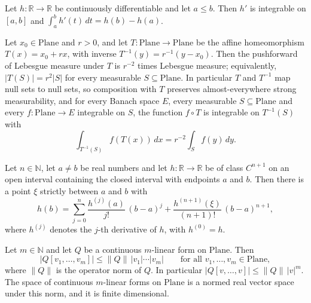 \begin{proposition}
Let $h\colon\mathbb{R}\to\mathbb{R}$ be continuously differentiable and let $a\le b$.  Then
$h'$ is integrable on $[a,b]$ and $\int_a^bh'(t)\,dt=h(b)-h(a)$.
\end{proposition}

\begin{proposition}
Let $x_0\in\mathrm{Plane}$ and $r>0$, and let $T\colon\mathrm{Plane}\to\mathrm{Plane}$ be the
affine homeomorphism $T(x)=x_0+rx$, with inverse $T^{-1}(y)=r^{-1}(y-x_0)$.  Then the
pushforward of Lebesgue measure under $T$ is $r^{-2}$ times Lebesgue measure; equivalently,
$\lvert T(S)\rvert=r^{2}\lvert S\rvert$ for every measurable $S\subseteq\mathrm{Plane}$.  In
particular $T$ and $T^{-1}$ map null sets to null sets, so composition with $T$ preserves
almost-everywhere strong measurability, and for every Banach space $E$, every measurable
$S\subseteq\mathrm{Plane}$ and every $f\colon\mathrm{Plane}\to E$ integrable on $S$, the
function $f\circ T$ is integrable on $T^{-1}(S)$ with
\[
  \int_{T^{-1}(S)}f(T(x))\,dx=r^{-2}\int_{S}f(y)\,dy .
\]
\end{proposition}

\begin{proposition}
Let $n\in\mathbb{N}$, let $a\neq b$ be real numbers and let $h\colon\mathbb{R}\to\mathbb{R}$ be
of class $C^{n+1}$ on an open interval containing the closed interval with endpoints $a$ and
$b$.  Then there is a point $\xi$ strictly between $a$ and $b$ with
\[
  h(b)=\sum_{j=0}^{n}\frac{h^{(j)}(a)}{j!}\,(b-a)^{j}
        +\frac{h^{(n+1)}(\xi)}{(n+1)!}\,(b-a)^{n+1},
\]
where $h^{(j)}$ denotes the $j$-th derivative of $h$, with $h^{(0)}=h$.
\end{proposition}

\begin{proposition}
Let $m\in\mathbb{N}$ and let $Q$ be a continuous $m$-linear form on $\mathrm{Plane}$.  Then
\[
  \lvert Q[v_1,\ldots,v_m]\rvert\le\lVert Q\rVert\,\lvert v_1\rvert\cdots\lvert v_m\rvert
  \qquad\text{for all }v_1,\ldots,v_m\in\mathrm{Plane},
\]
where $\lVert Q\rVert$ is the operator norm of $Q$.  In particular
$\lvert Q[v,\ldots,v]\rvert\le\lVert Q\rVert\,\lvert v\rvert^{m}$.  The space of continuous
$m$-linear forms on $\mathrm{Plane}$ is a normed real vector space under this norm, and it is
finite dimensional.
\end{proposition}

